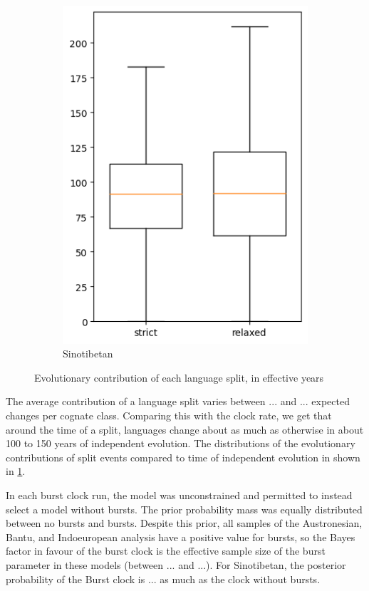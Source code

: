 \documentclass[a4paper,12pt]{scrartcl}
\begin{document}
\begin{figure}
\begin{subfigure}{0.4\textwidth}
    \includegraphics[width=\textwidth]{supplement/analysis/sinotibetan_years_per_split.png}
    \caption{Sinotibetan}
  \end{subfigure}
  \caption{Evolutionary contribution of each language split, in effective years}
  \label{f:peryear}
\end{figure}

The average contribution of a language split varies between $...$ and $...$
expected changes per cognate class. Comparing this with the clock rate, we get
that around the time of a split, languages change about as much as otherwise in
about 100 to 150 years of independent evolution. The distributions of the
evolutionary contributions of split events compared to time of independent
evolution in shown in \cref{f:peryear}.

In each burst clock run, the model was unconstrained and permitted to instead
select a model without bursts. The prior probability mass was equally distributed
between no bursts and bursts. Despite this prior, all samples of the
Austronesian, Bantu, and Indoeuropean analysis have a positive value for bursts,
so the Bayes factor in favour of the burst clock is the effective sample size of
the burst parameter in these models (between $...$ and $...$). For Sinotibetan,
the posterior probability of the Burst clock is $...$ as much as the clock
without bursts.
\end{document}
